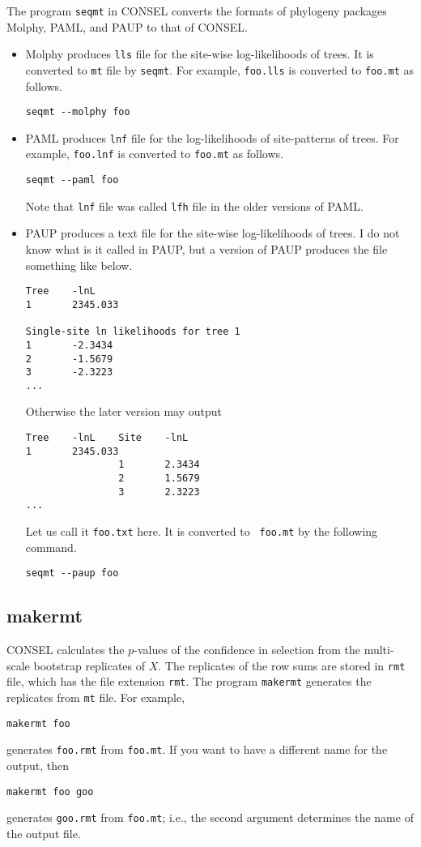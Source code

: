 \documentclass[12pt]{article}
\begin{document}
The program {\tt seqmt} in CONSEL converts the formats of phylogeny
packages Molphy, PAML, and PAUP to that of CONSEL.
\begin{itemize}
 \item Molphy produces {\tt lls} file for the site-wise log-likelihoods
       of trees. It is converted to {\tt mt} file by {\tt seqmt}. For
       example, {\tt foo.lls} is converted to {\tt foo.mt} as follows.
\begin{verbatim}
seqmt --molphy foo
\end{verbatim}
 \item PAML produces {\tt lnf} file for the log-likelihoods of
       site-patterns of trees.  For example, {\tt foo.lnf} is converted
       to {\tt foo.mt} as follows.
\begin{verbatim}
seqmt --paml foo
\end{verbatim}
       Note that {\tt lnf} file was called {\tt lfh} file in the older
       versions of PAML.
 \item PAUP produces a text file for the site-wise log-likelihoods of
       trees. I do not know what is it called in PAUP, but a version of
       PAUP produces the file something like below.
\begin{verbatim}
Tree    -lnL
1       2345.033

Single-site ln likelihoods for tree 1
1       -2.3434
2       -1.5679
3       -2.3223
...
\end{verbatim}
       Otherwise the later version may output
\begin{verbatim}
Tree    -lnL    Site    -lnL
1       2345.033
                1       2.3434
                2       1.5679
                3       2.3223
...
\end{verbatim}
       Let us call it {\tt foo.txt} here.  It is converted to {\tt
       foo.mt} by the following command.
\begin{verbatim}
seqmt --paup foo
\end{verbatim}
\end{itemize}

\subsection{makermt}

CONSEL calculates the $p$-values of the confidence in selection from the
multi-scale bootstrap replicates of $X$. The replicates of the row sums
are stored in {\tt rmt} file, which has the file extension {\tt rmt}.
The program {\tt makermt} generates the replicates from {\tt mt}
file. For example,
\begin{verbatim}
makermt foo
\end{verbatim}
generates {\tt foo.rmt} from {\tt foo.mt}.  If you want to have a
different name for the output, then 
\begin{verbatim}
makermt foo goo
\end{verbatim}
generates {\tt goo.rmt} from {\tt foo.mt}; i.e., the second argument
determines the name of the output file.
\end{document}
